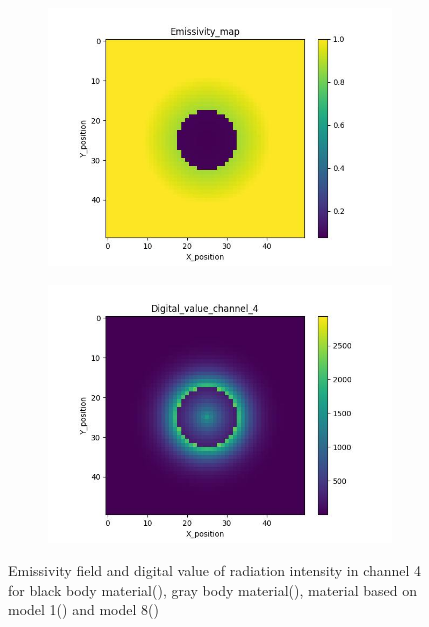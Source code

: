 \begin{figure}[htbp]
    \begin{minipage}{\textwidth}
        \centering
        \begin{subfigure}{0.45\textwidth}
            \includegraphics[width=\textwidth]{figures/raw_data/32/emi_field.jpg}
        \end{subfigure}
        \begin{subfigure}{0.45\textwidth}
            \centering
            \includegraphics[width=\textwidth]{figures/raw_data/32/digital_value_channel_4.jpg}
        \end{subfigure}
        \label{fig: raw_data_32}
    \end{minipage}
    \caption{Emissivity field and digital value of radiation intensity in channel 4 for 
    black body material(), gray body material(), 
    material based on model 1() and model 8()}
    \label{fig: raw_data}
\end{figure}

